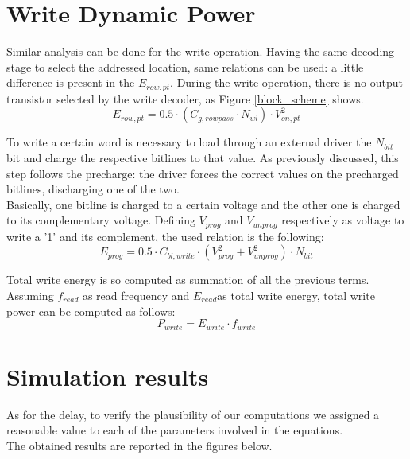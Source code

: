 \section{Write Dynamic Power}
\label{sec:write_power}

Similar analysis can be done for the write operation. Having the same decoding stage to select the addressed location, same relations can be used: a little difference is present in the $E_{row,pt}$. During the write operation, there is no output transistor selected by the write decoder, as Figure \ref{block_scheme} shows.
\[
E_{row,pt}= 0.5 \cdot (C_{g,rowpass} \cdot N_{wl}) \cdot V_{on,pt}^2
\]

To write a certain word is necessary to load through an external driver the $N_{bit}$ bit and charge the respective bitlines to that value. As previously discussed, this step follows the precharge: the driver forces the correct values on the precharged bitlines, discharging one of the two.\\
Basically, one bitline is charged to a certain voltage and the other one is charged to its complementary voltage. Defining $V_{prog}$ and $V_{unprog}$ respectively as voltage to write a '1' and its complement, the used relation is the following:
\[
E_{prog}=0.5 \cdot C_{bl,write} \cdot (V_{prog}^2+V_{unprog}^2) \cdot N_{bit}
\]

Total write energy is so computed as summation of all the previous terms.
Assuming $f_{read}$ as read frequency and $E_{read}$as total write energy, total write power can be computed as follows:
\[
P_{write}=E_{write}\cdot f_{write}
\]

\section{Simulation results}
As for the delay, to verify the plausibility of our computations we assigned a reasonable value to each of the parameters involved in the equations.\\
The obtained results are reported in the figures below.


